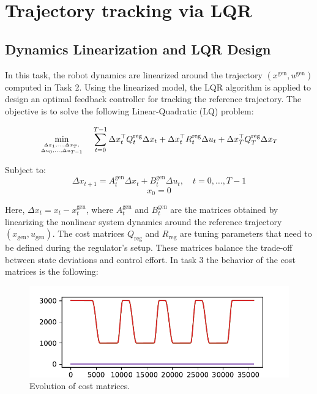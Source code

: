 \chapter{Trajectory tracking via LQR}
\section{Dynamics Linearization and LQR Design}
In this task, the robot dynamics are linearized around the trajectory $(x^{\text{gen}}, u^{\text{gen}})$ computed in Task 2. Using the linearized model, the LQR algorithm is applied to design an optimal feedback controller for tracking the reference trajectory. The objective is to solve the following Linear-Quadratic (LQ) problem:

\[
\min_{\Delta x_1, \ldots, \Delta x_T, \atop \Delta u_0, \ldots, \Delta u_{T-1}} \quad
\sum_{t=0}^{T-1} \Delta x_t^\top Q_t^{\text{reg}} \Delta x_t + \Delta x_t^\top R_t^{\text{reg}} \Delta u_t + \Delta x_T^\top Q_T^{\text{reg}} \Delta x_T
\]



Subject to:  
\[
\Delta x_{t+1} = A_t^{\text{gen}} \Delta x_t + B_t^{\text{gen}} \Delta u_t, \quad t = 0, \ldots, T-1
\]  
\[
x_0 = 0
\]

Here, $\Delta x_t = x_t - x_t^{\text{gen}}$, where $A_t^{\text{gen}}$ and $B_t^{\text{gen}}$ are the matrices obtained by linearizing the nonlinear system dynamics around the reference trajectory $(x_{\text{gen}}, u_{\text{gen}})$. The cost matrices $Q_{\text{reg}}$ and $R_{\text{reg}}$ are tuning parameters that need to be defined during the regulator's setup. These matrices balance the trade-off between state deviations and control effort. In task 3 the behavior of the cost matrices is the following:

\begin{figure}[htb]
    \centering
    \includegraphics[width=0.8\linewidth]{img/3-task3/evolution_cost_task3.pdf}
    \caption{Evolution of cost matrices.}
    \label{fig:dtheta2-evolution}
\end{figure}

